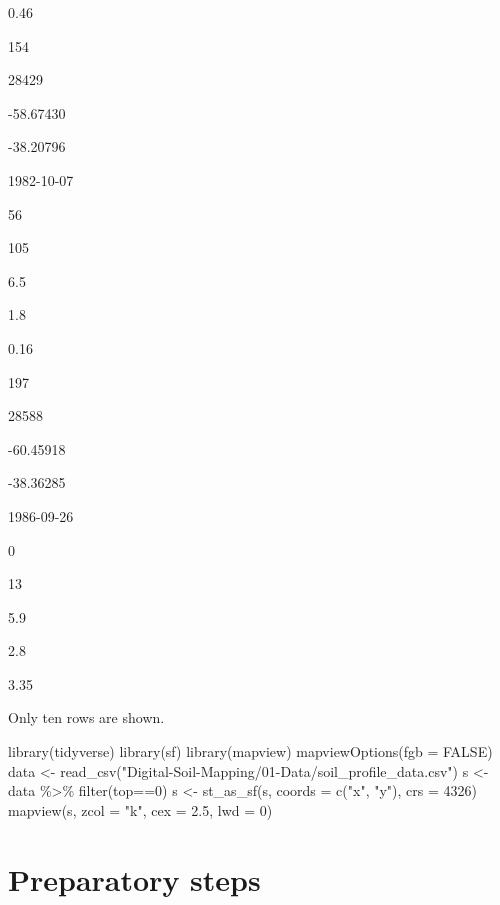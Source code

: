 \documentclass[
  10pt,
  b5paper,
  oneside]{book}
\newenvironment{Shaded}{\begin{snugshade}}{\end{snugshade}}
\newcommand{\AttributeTok}[1]{\textcolor[rgb]{0.77,0.63,0.00}{#1}}
\newcommand{\ConstantTok}[1]{\textcolor[rgb]{0.00,0.00,0.00}{#1}}
\newcommand{\DecValTok}[1]{\textcolor[rgb]{0.00,0.00,0.81}{#1}}
\newcommand{\FloatTok}[1]{\textcolor[rgb]{0.00,0.00,0.81}{#1}}
\newcommand{\FunctionTok}[1]{\textcolor[rgb]{0.00,0.00,0.00}{#1}}
\newcommand{\NormalTok}[1]{#1}
\newcommand{\OtherTok}[1]{\textcolor[rgb]{0.56,0.35,0.01}{#1}}
\newcommand{\SpecialCharTok}[1]{\textcolor[rgb]{0.00,0.00,0.00}{#1}}
\newcommand{\StringTok}[1]{\textcolor[rgb]{0.31,0.60,0.02}{#1}}
\begin{document}
0.46

154

28429

-58.67430

-38.20796

1982-10-07

56

105

6.5

1.8

0.16

197

28588

-60.45918

-38.36285

1986-09-26

0

13

5.9

2.8

3.35

Only ten rows are shown.

\begin{Shaded}
\begin{Highlighting}[]
\FunctionTok{library}\NormalTok{(tidyverse)}
\FunctionTok{library}\NormalTok{(sf)}
\FunctionTok{library}\NormalTok{(mapview)}
\FunctionTok{mapviewOptions}\NormalTok{(}\AttributeTok{fgb =} \ConstantTok{FALSE}\NormalTok{)}
\NormalTok{data }\OtherTok{\textless{}{-}} \FunctionTok{read\_csv}\NormalTok{(}\StringTok{"Digital{-}Soil{-}Mapping/01{-}Data/soil\_profile\_data.csv"}\NormalTok{)}
\NormalTok{s }\OtherTok{\textless{}{-}}\NormalTok{ data }\SpecialCharTok{\%\textgreater{}\%} \FunctionTok{filter}\NormalTok{(top}\SpecialCharTok{==}\DecValTok{0}\NormalTok{)}
\NormalTok{s }\OtherTok{\textless{}{-}} \FunctionTok{st\_as\_sf}\NormalTok{(s, }\AttributeTok{coords =} \FunctionTok{c}\NormalTok{(}\StringTok{"x"}\NormalTok{, }\StringTok{"y"}\NormalTok{), }\AttributeTok{crs =} \DecValTok{4326}\NormalTok{)}
\FunctionTok{mapview}\NormalTok{(s, }\AttributeTok{zcol =} \StringTok{"k"}\NormalTok{, }\AttributeTok{cex =} \FloatTok{2.5}\NormalTok{, }\AttributeTok{lwd =} \DecValTok{0}\NormalTok{)}
\end{Highlighting}
\end{Shaded}

\hypertarget{preparatory-steps}{%
\section{Preparatory steps}\label{preparatory-steps}}
\end{document}
